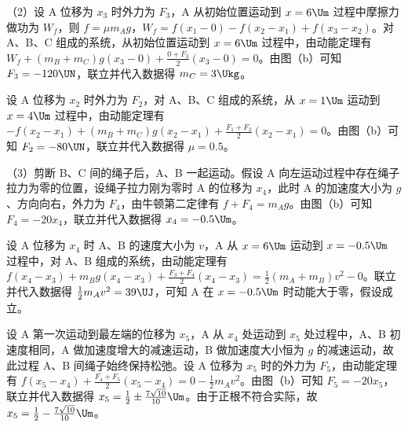 \documentclass[\gkver]{gaokaozhenti}
\begin{document}
\begin{enumerate}
{（2）设 A 位移为 $x_3$ 时外力为 $F_3$，A 从初始位置运动到 $x=6\Um$ 过程中摩擦力做功为 $W_f$，则 $f=\mu m_Ag$，$W_f=f(x_1-0)-f(x_2-x_1)+f(x_3-x_2)$。对 A、B、C 组成的系统，从初始位置运动到 $x=6\Um$ 过程中，由动能定理有 $W_f+(m_B+m_C)g(x_3-0)+\frac{0+F_3}{2}(x_3-0)=0$。由图（b）可知 $F_3=-120\UN$，联立并代入数据得 $m_C=3\Ukg$。

设 A 位移为 $x_2$ 时外力为 $F_2$，对 A、B、C 组成的系统，从 $x=1\Um$ 运动到 $x=4\Um$ 过程中，由动能定理有 $-f(x_2-x_1)+(m_B+m_C)g(x_2-x_1)+\frac{F_1+F_2}{2}(x_2-x_1)=0$。由图（b）可知 $F_2=-80\UN$，联立并代入数据得 $\mu=0.5$。

（3）剪断 B、C 间的绳子后，A、B 一起运动。假设 A 向左运动过程中存在绳子拉力为零的位置，设绳子拉力刚为零时 A 的位移为 $x_4$，此时 A 的加速度大小为 $g$、方向向右，外力为 $F_4$，由牛顿第二定律有 $f+F_4=m_Ag$。由图（b）可知 $F_4=-20x_4$，联立并代入数据得 $x_4=-0.5\Um$。

设 A 位移为 $x_4$ 时 A、B 的速度大小为 $v$，A 从 $x=6\Um$ 运动到 $x=-0.5\Um$ 过程中，对 A、B 组成的系统，由动能定理有 $f(x_4-x_3)+m_Bg(x_4-x_3)+\frac{F_3+F_4}{2}(x_4-x_3)=\frac{1}{2}(m_A+m_B)v^2-0$。联立并代入数据得 $\frac{1}{2}m_Av^2=39\UJ$，可知 A 在 $x=-0.5\Um$ 时动能大于零，假设成立。

设 A 第一次运动到最左端的位移为 $x_5$，A 从 $x_4$ 处运动到 $x_5$ 处过程中，A、B 初速度相同，A 做加速度增大的减速运动，B 做加速度大小恒为 $g$ 的减速运动，故此过程 A、B 间绳子始终保持松弛。设 A 位移为 $x_5$ 时的外力为 $F_5$，由动能定理有 $f(x_5-x_4)+\frac{F_4+F_5}{2}(x_5-x_4)=0-\frac{1}{2}m_Av^2$。由图（b）可知 $F_5=-20x_5$，联立并代入数据得 $x_5=\frac{1}{2}\pm\frac{7\sqrt{10}}{10}\Um$。由于正根不符合实际，故 $x_5=\frac{1}{2}-\frac{7\sqrt{10}}{10}\Um$。
}

\end{enumerate}
\end{document}
